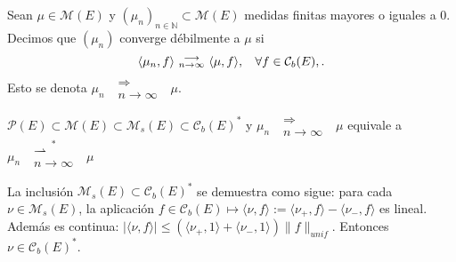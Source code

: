 \begin{definition}
Sean $\mu\in \mathcal{M}(E)$ y $(\mu_n)_{n \in \mathbb{N}}\subset \mathcal{M}(E)$ medidas finitas mayores o iguales a $0$. Decimos que $(\mu_n)$ converge débilmente a $\mu$ si 
$$\langle \mu_n,f\rangle \mbox{ }\substack{\longrightarrow \\ n\to\infty}\mbox{ } \langle \mu,f \rangle, \hspace{.25cm}\, \forall f \in \mathcal{C}_b(E), .$$
Esto se denota $\mu_n \mbox{ }\substack{\Longrightarrow \\n \to \infty}\mbox{ } \mu$.
\end{definition}
\begin{remark}
$\mathcal{P}(E)\subset \mathcal{M}(E) \subset \mathcal{M}_s(E) \subset\mathcal{C}_b(E)^*$ \espacio y \espacio$\mu_n \mbox{ }\substack{\Longrightarrow \\n \to \infty}\mbox{ } \mu$ equivale a $\displaystyle \mu_n \mbox{ }\overset{\ast}{\substack{\rightharpoonup\\n \to\infty}} \mbox{ }\mu$

La inclusión $\mathcal{M}_s(E) \subset\mathcal{C}_b(E)^*$ se demuestra como sigue: para cada $\nu\in\mathcal{M}_s(E)$, la aplicación $f\in\mathcal{C}_b(E)\mapsto\langle \nu,f\rangle:=\langle \nu_+,f\rangle-\langle \nu_-,f\rangle$ es lineal. Además es continua: $|\langle\nu,f\rangle|\leq (\langle \nu_+,1\rangle+\langle \nu_-,1\rangle)\|f\|_{unif}$. Entonces $\nu\in\mathcal{C}_b(E)^*$.
\end{remark}

